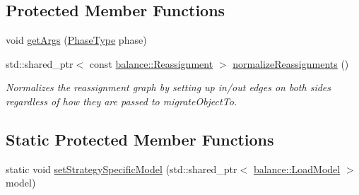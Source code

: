 \subsection*{Protected Member Functions}
\begin{DoxyCompactItemize}
\item 
void \hyperlink{structvt_1_1vrt_1_1collection_1_1lb_1_1_base_l_b_a4ec045a3c6231d055b6e851de3016bba}{get\+Args} (\hyperlink{namespacevt_a46ce6733d5cdbd735d561b7b4029f6d7}{Phase\+Type} phase)
\item 
std\+::shared\+\_\+ptr$<$ const \hyperlink{structvt_1_1vrt_1_1collection_1_1balance_1_1_reassignment}{balance\+::\+Reassignment} $>$ \hyperlink{structvt_1_1vrt_1_1collection_1_1lb_1_1_base_l_b_a9ecdb512cc5a87d637e48ab8d5b49b43}{normalize\+Reassignments} ()
\begin{DoxyCompactList}\small\item\em Normalizes the reassignment graph by setting up in/out edges on both sides regardless of how they are passed to {\ttfamily migrate\+Object\+To}. \end{DoxyCompactList}\end{DoxyCompactItemize}
\subsection*{Static Protected Member Functions}
\begin{DoxyCompactItemize}
\item 
static void \hyperlink{structvt_1_1vrt_1_1collection_1_1lb_1_1_base_l_b_abe5e30efbdb728854de25beb605189ae}{set\+Strategy\+Specific\+Model} (std\+::shared\+\_\+ptr$<$ \hyperlink{structvt_1_1vrt_1_1collection_1_1balance_1_1_load_model}{balance\+::\+Load\+Model} $>$ model)
\end{DoxyCompactItemize}
